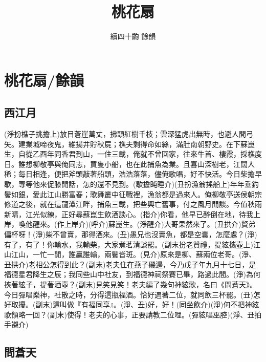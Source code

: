 \documentclass[UTF8]{ctexart}
\title{桃花扇}
\author{續四十齣 餘韻}
\begin{document}
\tableofcontents

\newpage

\section*{桃花扇/餘韻}

\subsection{西江月}

(淨扮樵子挑擔上)放目蒼崖萬丈，拂頭紅樹千枝；雲深猛虎出無時，也避人間弓矢。建業城啼夜鬼，維揚井貯秋屍；樵夫剩得命如絲，滿肚南朝野史。在下蘇崑生，自從乙酉年同香君到山，一住三載，俺就不曾回家，往來牛首、棲霞，採樵度日。誰想柳敬亭與俺同志，買隻小船，也在此捕魚為業。且喜山深樹老，江闊人稀；每日相逢，便把斧頭敲著船頭，浩浩落落，儘俺歌唱，好不快活。今日柴擔早歇，專等他來促膝閒話，怎的還不見到。(歇擔盹睡介)(丑扮漁翁搖船上)年年垂釣鬢如銀，愛此江山勝富春；歌舞叢中征戰裡，漁翁都是過來人。俺柳敬亭送侯朝宗修道之後，就在這龍潭江畔，捕魚三載，把些興亡舊事，付之風月閒談。今值秋雨新晴，江光似練，正好尋蘇崑生飲酒談心。(指介)你看，他早已醉倒在地，待我上岸，喚他醒來。(作上岸介)(呼介)蘇崑生。(淨醒介)大哥果然來了。(丑拱介)賢弟偏杯呀！(淨)柴不曾賣，那得酒來。(丑)愚兄也沒賣魚，都是空囊，怎麼處？(淨)有了，有了！你輸水，我輸柴，大家煮茗清談罷。(副末扮老贊禮，提絃攜壺上)江山江山，一忙一閒，誰贏誰輸，兩鬢皆斑。(見介)原來是柳、蘇兩位老哥。(淨、丑拱介)老相公怎得到此？(副末)老夫住在燕子磯邊，今乃戊子年九月十七日，是福德星君降生之辰；我同些山中社友，到福德神祠祭賽已畢，路過此間。(淨)為何挾著絃子，提著酒壺？(副末)見笑見笑！老夫編了幾句神絃歌，名曰《問蒼天》。今日彈唱樂神，社散之時，分得這瓶福酒。恰好遇著二位，就同飲三杯罷。(丑)怎好取擾。(副末)這叫做『有福同享』。(淨、丑)好，好！(同坐飲介)(淨)何不把神絃歌領略一回？(副末)使得！老夫的心事，正要請教二位哩。(彈絃唱巫腔)(淨、丑拍手襯介)

\subsection{問蒼天}
\end{document}
